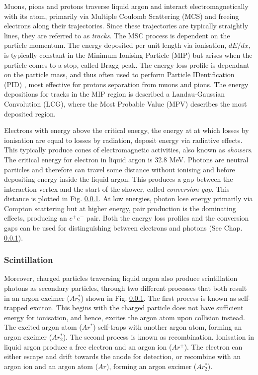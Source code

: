 Muons, pions and protons traverse liquid argon and interact electromagnetically with its atom, primarily via Multiple Coulomb Scattering (MCS) and freeing electrons along their trajectories.
Since these trajectories are typically straightly lines, they are referred to as \textit{tracks}.
The MSC process is dependent on the particle momentum.
The energy deposited per unit length via ionisation, $dE/dx$, is typically constant in the Minimum Ionising Particle (MIP) but arises when the particle comes to a stop, called Bragg peak.
The energy loss profile is dependant on the particle mass, and thus often used to perform Particle IDentification (PID) \cite{}, most effective for protons separation from muons and pions.
The energy depositions for tracks in the MIP region is described a Landau-Gaussian Convolution (LCG), where the Most Probable Value (MPV) describes the most deposited region.

Electrons with energy above the critical energy, the energy at at which losses by ionisation are equal to losses by radiation, deposit energy via radiative effects.
This typically produce cones of electromagnetic activities, also known as \textit{showers}. 
The critical energy for electron in liquid argon is 32.8 MeV.
Photons are neutral particles and therefore can travel some distance without ionising and before depositing energy inside the liquid argon.
This produces a gap between the interaction vertex and the start of the shower, called \textit{conversion gap}.
This distance is plotted in Fig. \ref{}.
At low energies, photon lose energy primarily via Compton scattering but at higher energy, pair production is the dominating effects, producing an $e^{+}e^{-}$ pair.
Both the energy loss profiles and the conversion gaps can be used for distinguishing between electrons and photons (See Chap. \ref{}). 

\subsubsection{Scintillation}
Moreover, charged particles traversing liquid argon also produce scintillation photons as secondary particles, through two different processes that both result in an argon excimer ($Ar_{2}^{*}$) shown in Fig. \ref{}.
The first process is known as self-trapped exciton.
This begins with the charged particle does not have sufficient energy for ionisation, and hence, excites the argon atom upon collision instead.
The excited argon atom ($Ar^{*}$) self-traps with another argon atom, forming an argon excimer ($Ar^{*}_{2}$).
The second process is known as recombination.
Ionisation in liquid argon produce a free electron and an argon ion ($Ar^{+}$).
The electron can either escape and drift towards the anode for detection, or recombine with an argon ion and an argon atom ($Ar$), forming an argon excimer ($Ar_{2}^{*}$).


